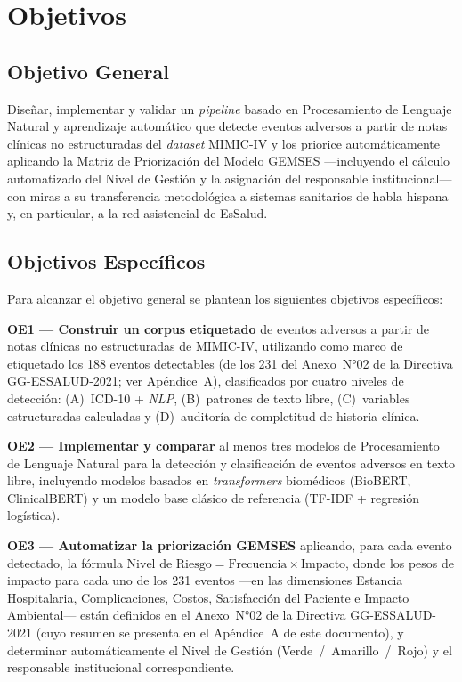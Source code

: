 \documentclass[12pt,a4paper,oneside]{book}
\begin{document}
\chapter{Objetivos}

\section{Objetivo General}

Diseñar, implementar y validar un \textit{pipeline} basado en Procesamiento de Lenguaje Natural y aprendizaje automático que detecte eventos adversos a partir de notas clínicas no estructuradas del \textit{dataset} MIMIC-IV y los priorice automáticamente aplicando la Matriz de Priorización del Modelo GEMSES ---incluyendo el cálculo automatizado del Nivel de Gestión y la asignación del responsable institucional--- con miras a su transferencia metodológica a sistemas sanitarios de habla hispana y, en particular, a la red asistencial de EsSalud.

\section{Objetivos Específicos}

Para alcanzar el objetivo general se plantean los siguientes objetivos específicos:

\textbf{OE1 --- Construir un corpus etiquetado} de eventos adversos a partir de notas clínicas no estructuradas de MIMIC-IV, utilizando como marco de etiquetado los 188 eventos detectables (de los 231 del Anexo~N°02 de la Directiva GG-ESSALUD-2021; ver Apéndice~A), clasificados por cuatro niveles de detección: (A)~ICD-10 + \textit{NLP}, (B)~patrones de texto libre, (C)~variables estructuradas calculadas y (D)~auditoría de completitud de historia clínica.

\textbf{OE2 --- Implementar y comparar} al menos tres modelos de Procesamiento de Lenguaje Natural para la detección y clasificación de eventos adversos en texto libre, incluyendo modelos basados en \textit{transformers} biomédicos (BioBERT, ClinicalBERT) y un modelo base clásico de referencia (TF-IDF + regresión logística).

\textbf{OE3 --- Automatizar la priorización GEMSES} aplicando, para cada evento detectado, la fórmula $\text{Nivel de Riesgo} = \text{Frecuencia} \times \text{Impacto}$, donde los pesos de impacto para cada uno de los 231 eventos ---en las dimensiones Estancia Hospitalaria, Complicaciones, Costos, Satisfacción del Paciente e Impacto Ambiental--- están definidos en el Anexo~N°02 de la Directiva GG-ESSALUD-2021 (cuyo resumen se presenta en el Apéndice~A de este documento), y determinar automáticamente el Nivel de Gestión (Verde~/~Amarillo~/~Rojo) y el responsable institucional correspondiente.
\end{document}
